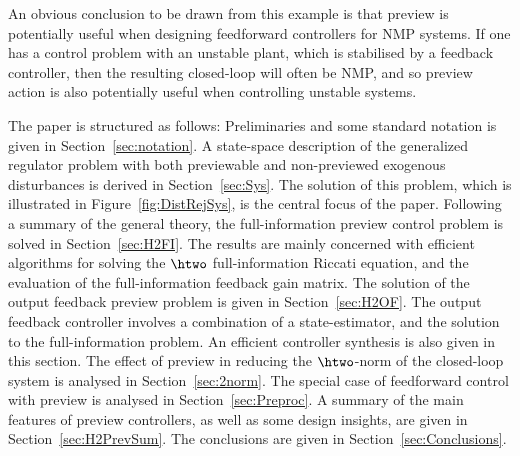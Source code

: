 An obvious conclusion to be drawn from this example is that preview is potentially useful when designing feedforward controllers for NMP systems. If one has a control problem with an unstable plant, which is stabilised by a feedback controller, then the resulting closed-loop will often be NMP, and so preview action is also potentially useful when controlling unstable systems.

The paper is structured as follows: Preliminaries and some standard notation is given in Section~\ref{sec:notation}. A state-space description of the generalized regulator problem with both previewable and non-previewed exogenous disturbances is derived in Section~\ref{sec:Sys}. The solution of this problem, which is illustrated in Figure~\ref{fig:DistRejSys}, is the central focus of the paper. Following a summary of the general theory, the full-information preview control problem is solved in Section~\ref{sec:H2FI}. The results are mainly concerned with efficient algorithms for solving the $\htwo$ full-information Riccati equation, and the evaluation of the full-information feedback gain matrix. The solution of the output feedback preview problem is given in Section~\ref{sec:H2OF}. The output feedback controller involves a combination of a state-estimator, and the solution to the full-information problem. An efficient controller synthesis is also given in this section. The effect of preview in reducing the $\htwo$-norm of the closed-loop system is analysed in Section~\ref{sec:2norm}. The special case of feedforward control with preview is analysed in Section~\ref{sec:Preproc}. A summary of the main features of preview controllers, as well as some design insights, are given in Section~\ref{sec:H2PrevSum}. The conclusions are given in Section~\ref{sec:Conclusions}.